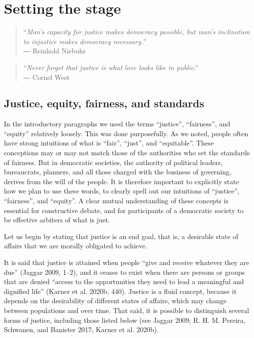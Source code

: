 \documentclass[12pt, oneside]{report}
\begin{document}
\hypertarget{sect2}{%
\section{Setting the stage}\label{sect2}}

\begin{quote}
``\emph{Man's capacity for justice makes democracy possible, but man's
inclination to injustice makes democracy necessary.}''\\
― Reinhold Niebuhr
\end{quote}

\begin{quote}
``\emph{Never forget that justice is what love looks like in
public}.''\\
― Cornel West
\end{quote}

\hypertarget{sect2.1}{%
\subsection{Justice, equity, fairness, and standards}\label{sect2.1}}

In the introductory paragraphs we used the terms ``justice'',
``fairness'', and ``equity'' relatively loosely. This was done
purposefully. As we noted, people often have strong intuitions of what
is ``fair'', ``just'', and ``equitable''. These conceptions may or may
not match those of the authorities who set the standards of fairness.
But in democratic societies, the authority of political leaders,
bureaucrats, planners, and all those charged with the business of
governing, derives from the will of the people. It is therefore
important to explicitly state how we plan to use these words, to clearly
spell out our intuitions of ``justice'', ``fairness'', and ``equity''. A
clear mutual understanding of these concepts is essential for
constructive debate, and for participants of a democratic society to be
effective arbiters of what is just.

Let us begin by stating that justice is an end goal, that is, a
desirable state of affairs that we are morally obligated to achieve.

It is said that justice is attained when people ``give and receive
whatever they are due'' (Jaggar 2009, 1--2), and it ceases to exist when
there are persons or groups that are denied ``access to the
opportunities they need to lead a meaningful and dignified life''
(Karner et al. 2020b, 440). Justice is a fluid concept, because it
depends on the desirability of different states of affairs, which may
change between populations and over time. That said, it is possible to
distinguish several forms of justice, including those listed below (see
Jaggar 2009; R. H. M. Pereira, Schwanen, and Banister 2017; Karner et
al. 2020b).
\end{document}
